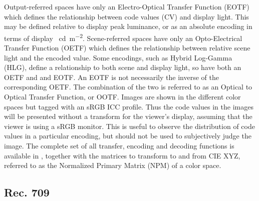 \begin{figure}[H]
    \label{fig:output-referred-gamuts}
\end{figure}

\begin{figure}[H]
    \label{fig:scene-referred-gamuts}
\end{figure}

\begin{figure}[H]
    \label{fig:log-encoding-curves}
\end{figure}

Output-referred spaces have only an Electro-Optical Transfer Function (EOTF) which defines the relationship between code values (CV) and display light.
This may be defined relative to display peak luminance, or as an absolute encoding in terms of display \SI{}{\candela\per\metre\squared}.
Scene-referred spaces have only an Opto-Electrical Transfer Function (OETF) which defines the relationship between relative scene light and the encoded value.
Some encodings, such as Hybrid Log-Gamma (HLG), define a relationship to both scene and display light, so have both an OETF and and EOTF.
An EOTF is not necessarily the inverse of the corresponding OETF.
The combination of the two is referred to as an Optical to Optical Transfer Function, or OOTF.
\ccPar{}
Images are shown in the different color spaces but tagged with an sRGB ICC profile.
Thus the code values in the images will be presented without a transform for the viewer's display, assuming that the viewer is using a sRGB monitor.
This is useful to observe the distribution of code values in a particular encoding, but should not be used to subjectively judge the image.
\ccPar{}
The complete set of all transfer, encoding and decoding functions is available in , together with the matrices to transform to and from CIE XYZ, referred to as the Normalized Primary Matrix (NPM) of a color space.

\subsection{Rec. 709}%
\label{subsec:rec-709}

